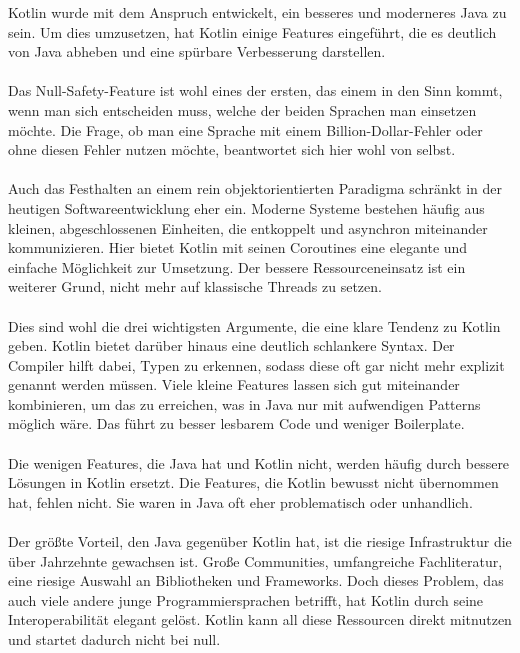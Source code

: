 \documentclass[11pt]{article}
\begin{document}
    Kotlin wurde mit dem Anspruch entwickelt, ein besseres und moderneres Java zu sein.
    Um dies umzusetzen, hat Kotlin einige Features eingeführt, die es deutlich von Java abheben und eine spürbare Verbesserung darstellen.\\
    \\
    Das Null-Safety-Feature ist wohl eines der ersten, das einem in den Sinn kommt, wenn man sich entscheiden muss, welche der beiden Sprachen man einsetzen möchte.
    Die Frage, ob man eine Sprache mit einem Billion-Dollar-Fehler oder ohne diesen Fehler nutzen möchte, beantwortet sich hier wohl von selbst.\\
    \\
    Auch das Festhalten an einem rein objektorientierten Paradigma schränkt in der heutigen Softwareentwicklung eher ein.
    Moderne Systeme bestehen häufig aus kleinen, abgeschlossenen Einheiten, die entkoppelt und asynchron miteinander kommunizieren.
    Hier bietet Kotlin mit seinen Coroutines eine elegante und einfache Möglichkeit zur Umsetzung.
    Der bessere Ressourceneinsatz ist ein weiterer Grund, nicht mehr auf klassische Threads zu setzen.\\
    \\
    Dies sind wohl die drei wichtigsten Argumente, die eine klare Tendenz zu Kotlin geben.
    Kotlin bietet darüber hinaus eine deutlich schlankere Syntax.
    Der Compiler hilft dabei, Typen zu erkennen, sodass diese oft gar nicht mehr explizit genannt werden müssen.
    Viele kleine Features lassen sich gut miteinander kombinieren, um das zu erreichen, was in Java nur mit aufwendigen Patterns möglich wäre.
    Das führt zu besser lesbarem Code und weniger Boilerplate.\\
    \\
    Die wenigen Features, die Java hat und Kotlin nicht, werden häufig durch bessere Lösungen in Kotlin ersetzt.
    Die Features, die Kotlin bewusst nicht übernommen hat, fehlen nicht.
    Sie waren in Java oft eher problematisch oder unhandlich.\\
    \\
    Der größte Vorteil, den Java gegenüber Kotlin hat, ist die riesige Infrastruktur die über Jahrzehnte gewachsen ist.
    Große Communities, umfangreiche Fachliteratur, eine riesige Auswahl an Bibliotheken und Frameworks.
    Doch dieses Problem, das auch viele andere junge Programmiersprachen betrifft, hat Kotlin durch seine Interoperabilität elegant gelöst.
    Kotlin kann all diese Ressourcen direkt mitnutzen und startet dadurch nicht bei null.\\
\end{document}
